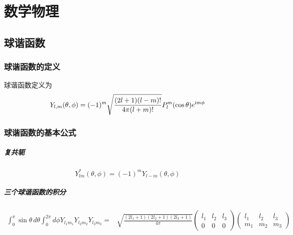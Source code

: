 \chapter{数学物理}

\section{球谐函数}
\subsection{球谐函数的定义}
球谐函数定义为
\begin{equation}
    Y_{l, m}(\theta, \phi) = (-1)^{m} \sqrt{\frac{(2l + 1)(l - m)!}{4\pi(l+m)!}} P_{l}^{m}(\cos{\theta}) e^{{\rm i}m\phi}
\end{equation}

\subsection{球谐函数的基本公式}
\paragraph*{复共轭}
\begin{equation}
    Y_{lm}^{\ast}(\theta, \phi) = (-1)^{m} Y_{l-m}(\theta, \phi)
    \label{eq:sp-ho}
\end{equation}

\paragraph*{三个球谐函数的积分}
\begin{equation}
    \begin{aligned}
        \int_{0}^{\pi}\sin{\theta}\, d\theta \int_{0}^{2\pi} d\phi
           Y_{l_1m_1} Y_{l_2m_2}Y_{l_3m_3}
        =& 
        \sqrt{\frac{(2l_1 + 1)(2l_2 + 1)(2l_3 + 1)}{4\pi}}
        \begin{pmatrix}
            l_1 & l_2 & l_3 \\
            0   & 0   & 0
        \end{pmatrix}
        \begin{pmatrix}
            l_1 & l_2 & l_3 \\
            m_1 & m_2 & m_3
        \end{pmatrix} \\
    \end{aligned}
\end{equation}